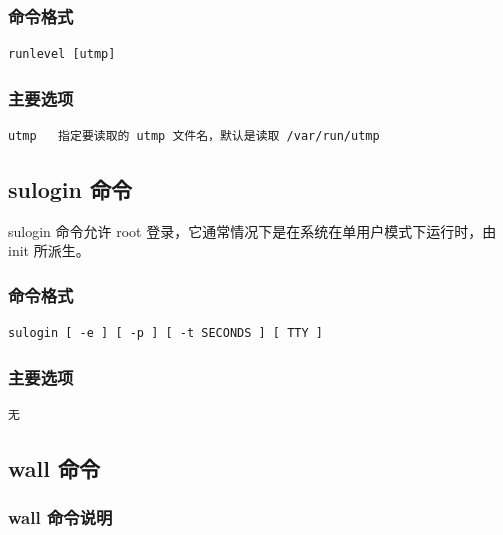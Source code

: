 \subsubsection{命令格式}

{\begin{shaded}\begin{verbatim}
runlevel [utmp]
\end{verbatim}\end{shaded}}
\subsubsection{主要选项}

{\begin{shaded}\begin{verbatim}
utmp   指定要读取的 utmp 文件名，默认是读取 /var/run/utmp
\end{verbatim}\end{shaded}}
\subsection{sulogin 命令}

sulogin 命令允许 root 登录，它通常情况下是在系统在单用户模式下运行时，由
init 所派生。

\subsubsection{命令格式}

{\begin{shaded}\begin{verbatim}
sulogin [ -e ] [ -p ] [ -t SECONDS ] [ TTY ]
\end{verbatim}\end{shaded}}
\subsubsection{主要选项}

{\begin{shaded}\begin{verbatim}
无
\end{verbatim}\end{shaded}}
\subsection{wall 命令}

\subsubsection{wall 命令说明}

